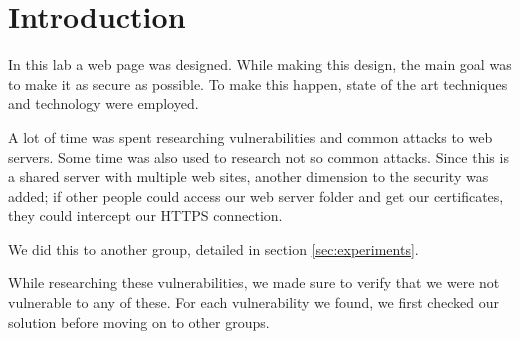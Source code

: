 \section{Introduction}

In this lab a web page was designed.
While making this design, the main goal was to make it as secure as possible.
To make this happen, state of the art techniques and technology were employed.

A lot of time was spent researching vulnerabilities and common attacks to web servers.
Some time was also used to research not so common attacks.
Since this is a shared server with multiple web sites, another dimension to the security was added;
if other people could access our web server folder and get our certificates, they could intercept our HTTPS connection.

We did this to another group, detailed in section \ref{sec:experiments}.

While researching these vulnerabilities, we made sure to verify that we were not vulnerable to any of these.
For each vulnerability we found, we first checked our solution before moving on to other groups.
